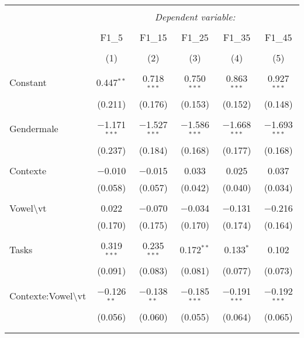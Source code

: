 
\begin{table}[!htbp] \centering 
  \caption{} 
  \label{} 
\begin{tabular}{@{\extracolsep{5pt}}lccccc} 
\\[-1.8ex]\hline 
\hline \\[-1.8ex] 
 & \multicolumn{5}{c}{\textit{Dependent variable:}} \\ 
\cline{2-6} 
\\[-1.8ex] & F1\_5 & F1\_15 & F1\_25 & F1\_35 & F1\_45 \\ 
\\[-1.8ex] & (1) & (2) & (3) & (4) & (5)\\ 
\hline \\[-1.8ex] 
 Constant & 0.447$^{**}$ & 0.718$^{***}$ & 0.750$^{***}$ & 0.863$^{***}$ & 0.927$^{***}$ \\ 
  & (0.211) & (0.176) & (0.153) & (0.152) & (0.148) \\ 
  & & & & & \\ 
 Gendermale & $-$1.171$^{***}$ & $-$1.527$^{***}$ & $-$1.586$^{***}$ & $-$1.668$^{***}$ & $-$1.693$^{***}$ \\ 
  & (0.237) & (0.184) & (0.168) & (0.177) & (0.168) \\ 
  & & & & & \\ 
 Contexte & $-$0.010 & $-$0.015 & 0.033 & 0.025 & 0.037 \\ 
  & (0.058) & (0.057) & (0.042) & (0.040) & (0.034) \\ 
  & & & & & \\ 
 Vowel\textbackslash vt & 0.022 & $-$0.070 & $-$0.034 & $-$0.131 & $-$0.216 \\ 
  & (0.170) & (0.175) & (0.170) & (0.174) & (0.164) \\ 
  & & & & & \\ 
 Tasks & 0.319$^{***}$ & 0.235$^{***}$ & 0.172$^{**}$ & 0.133$^{*}$ & 0.102 \\ 
  & (0.091) & (0.083) & (0.081) & (0.077) & (0.073) \\ 
  & & & & & \\ 
 Contexte:Vowel\textbackslash vt & $-$0.126$^{**}$ & $-$0.138$^{**}$ & $-$0.185$^{***}$ & $-$0.191$^{***}$ & $-$0.192$^{***}$ \\ 
  & (0.056) & (0.060) & (0.055) & (0.064) & (0.065) \\ 
  & & & & & \\ 
\hline \\[-1.8ex] 

\end{tabular}
\end{table}
